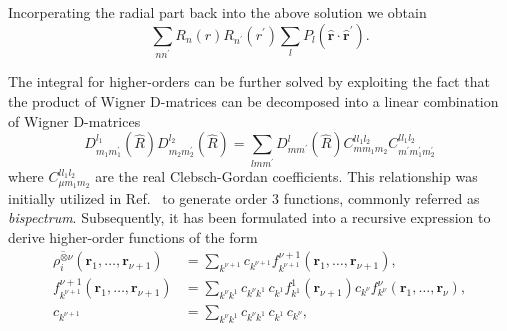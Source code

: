 Incorperating the radial part back into the above solution we obtain
\begin{equation}
  \label{eq:soap}
  \sum_{nn^\prime} R_n(r)R_{n^\prime}(r^\prime) \sum_{l} P_l(\hat{\mathbf{r}}\cdot\hat{\mathbf{r}}^\prime).
\end{equation}

The integral for higher-orders can be further solved by exploiting the fact that the product of Wigner D-matrices can be decomposed into a linear combination of Wigner D-matrices
\begin{equation}
  D^{l_1}_{m_1m_1^\prime}(\hat{R})D^{l_2}_{m_2m_2^\prime}(\hat{R}) = \sum_{l m m^\prime} D^{l}_{mm^\prime}(\hat{R}) C^{l l_1l_2}_{mm_1m_2}C^{l l_1l_2}_{m^\prime m_1^\prime m_2^\prime}
\end{equation}
where $C^{l l_1l_2}_{\mu m_1m_2}$ are the real Clebsch-Gordan coefficients\cite{yutsis1965theory,nigam2020recursive}.
This relationship was initially utilized in Ref.~\cite{bartok2013representing} to generate order 3 functions, commonly referred as \emph{bispectrum}.
Subsequently, it has been formulated into a recursive expression to derive higher-order functions of the form
\begin{subequations}
\label{eq:recursive_higherorder}
\begin{align}
  \overline{\rho_i^{\otimes\nu}}(\mathbf{r}_1, \ldots, \mathbf{r}_{\nu+1}) &= \sum_{k^{\nu+1}} c_{k^{\nu+1}} f^{\nu+1}_{k^{\nu+1}}(\mathbf{r}_1, \ldots, \mathbf{r}_{\nu+1}), \\
  f^{\nu+1}_{k^{\nu+1}}(\mathbf{r}_1, \ldots, \mathbf{r}_{\nu+1}) &= \sum_{k^\nu k^1} c_{k^\nu k^1}\, c_{k^1} f^{1}_{k^1}(\mathbf{r}_{\nu+1}) c_{k^\nu} f^{\nu}_{k^\nu}(\mathbf{r}_1, \ldots, \mathbf{r}_{\nu}), \\
  c_{k^{\nu+1}} &= \sum_{k^\nu k^1} c_{k^\nu k^1}\, c_{k^1}\, c_{k^\nu},
\end{align}
\end{subequations}
